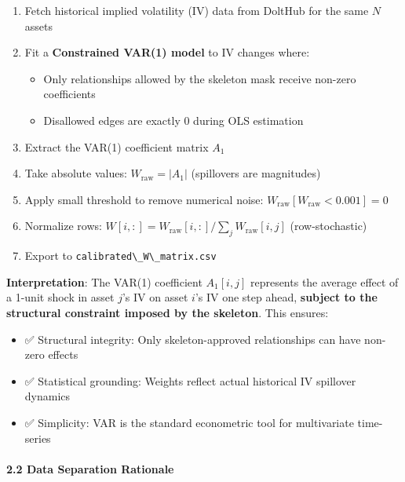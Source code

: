 \documentclass[
]{article}
\newcommand{\passthrough}[1]{#1}
\providecommand{\tightlist}{%
  \setlength{\itemsep}{0pt}\setlength{\parskip}{0pt}}
\begin{document}
\begin{enumerate}
\def\labelenumi{\arabic{enumi}.}
\tightlist
\item
  Fetch historical implied volatility (IV) data from DoltHub for the
  same \(N\) assets
\item
  Fit a \textbf{Constrained VAR(1) model} to IV changes where:

  \begin{itemize}
  \tightlist
  \item
    Only relationships allowed by the skeleton mask receive non-zero
    coefficients
  \item
    Disallowed edges are exactly 0 during OLS estimation
  \end{itemize}
\item
  Extract the VAR(1) coefficient matrix \(A_1\)
\item
  Take absolute values: \(W_{\text{raw}} = |A_1|\) (spillovers are
  magnitudes)
\item
  Apply small threshold to remove numerical noise:
  \(W_{\text{raw}}[W_{\text{raw}} < 0.001] = 0\)
\item
  Normalize rows:
  \(W[i,:] = W_{\text{raw}}[i,:] / \sum_j W_{\text{raw}}[i,j]\)
  (row-stochastic)
\item
  Export to \passthrough{\lstinline!calibrated\_W\_matrix.csv!}
\end{enumerate}

\textbf{Interpretation}: The VAR(1) coefficient \(A_1[i,j]\) represents
the average effect of a 1-unit shock in asset \(j\)'s IV on asset
\(i\)'s IV one step ahead, \textbf{subject to the structural constraint
imposed by the skeleton}. This ensures:

\begin{itemize}
\tightlist
\item
  ✅ Structural integrity: Only skeleton-approved relationships can have
  non-zero effects
\item
  ✅ Statistical grounding: Weights reflect actual historical IV
  spillover dynamics\\
\item
  ✅ Simplicity: VAR is the standard econometric tool for multivariate
  time-series
\end{itemize}

\paragraph{2.2 Data Separation
Rationale}\label{data-separation-rationale}
\end{document}
